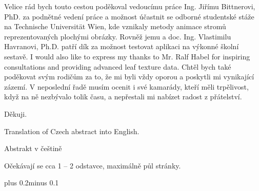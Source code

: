 \documentclass[11pt,twoside,a4paper]{book}
\begin{document}

\coverpagestarts


\acknowledgements
\noindent
Velice rád bych touto cestou poděkoval vedoucímu práce Ing. Jiřímu Bittnerovi, PhD. za podnětné vedení práce a možnost účastnit se odborné studentské stáže na Technische Universität Wien, kde vznikaly metody animace stromů reprezentovaných plochými obrázky. Rovněž jemu a doc. Ing. Vlastimilu Havranovi, Ph.D. patří dík za možnost testovat aplikaci na výkonné školní sestavě.
\newline
I would also like to express my thanks to Mr. Ralf Habel for inspiring consultations and providing advanced leaf texture data.
\newline 
Chtěl bych také poděkovat svým rodičům za to, že mi byli vždy oporou a poskytli mi vynikající zázemí. 
\newline 
V neposlední řadě musím ocenit i své kamarády, kteří měli trpělivost, když na ně nezbývalo tolik času, a nepřestali mi nabízet radost z přátelství.

Děkuji.





 
\abstractpage

Translation of Czech abstract into English.


\baselineskip

\noindent
Abstrakt v češtině

\noindent
Očekávají se cca 1 -- 2 odstavce, maximálně půl stránky.


\tableofcontents



\mainbodystarts
\normalfont
{}\baselineskip plus 0.2\baselineskip minus 0.1\baselineskip

\end{document}
